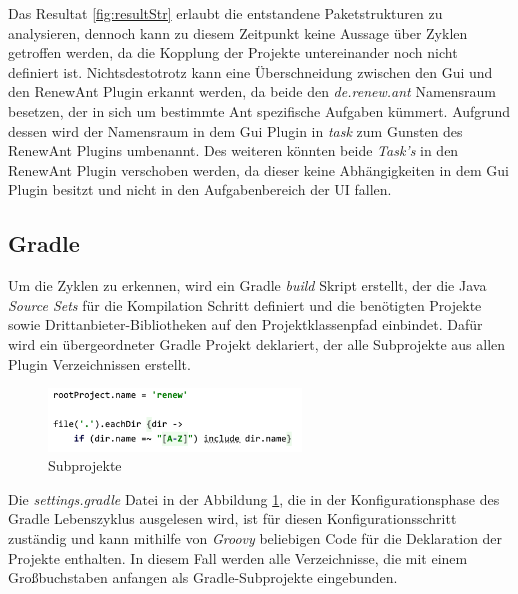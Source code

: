 	Das Resultat \ref{fig:resultStr} erlaubt die entstandene Paketstrukturen zu analysieren, dennoch kann zu diesem Zeitpunkt keine Aussage über Zyklen getroffen werden, da die Kopplung der Projekte untereinander noch nicht definiert ist. Nichtsdestotrotz kann eine Überschneidung zwischen den Gui und den RenewAnt Plugin erkannt werden, da beide den \textit{de.renew.ant} Namensraum besetzen, der in sich um bestimmte Ant spezifische Aufgaben kümmert. Aufgrund dessen wird der Namensraum in dem Gui Plugin in \textit{task} zum Gunsten des RenewAnt Plugins umbenannt. Des weiteren könnten beide \textit{Task's} in den RenewAnt Plugin verschoben werden, da dieser keine Abhängigkeiten in dem Gui Plugin besitzt und nicht in den Aufgabenbereich der UI fallen. 

\subsection{Gradle}

 	Um die Zyklen zu erkennen, wird ein Gradle \textit{build} Skript erstellt, der die Java \textit{Source Sets} für die Kompilation Schritt definiert und die benötigten Projekte sowie Drittanbieter-Bibliotheken auf den Projektklassenpfad einbindet. Dafür wird ein übergeordneter Gradle Projekt deklariert, der alle Subprojekte aus allen Plugin Verzeichnissen erstellt. 

	\begin{figure}[h!]
	  \centering
	  \includegraphics[width=0.6\textwidth]{material/images/settings_gradle.png}
	  \caption{Subprojekte}
	  \label{fig:subprojekte}
	\end{figure}

 	Die \textit{settings.gradle} Datei in der Abbildung \ref{fig:subprojekte}, die in der Konfigurationsphase des Gradle Lebenszyklus ausgelesen wird, ist für diesen Konfigurationsschritt zuständig und kann mithilfe von \textit{Groovy} beliebigen Code für die Deklaration der Projekte enthalten. In diesem Fall werden alle Verzeichnisse, die mit einem Großbuchstaben anfangen als Gradle-Subprojekte eingebunden. 
	\newpage

